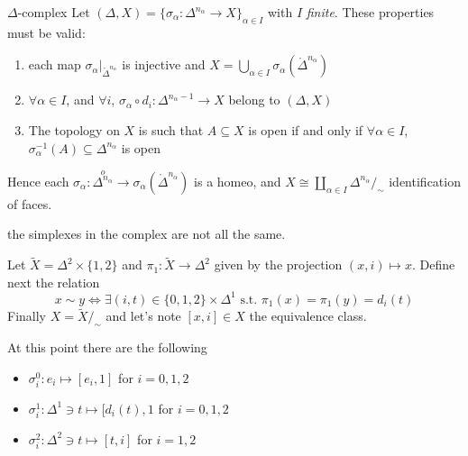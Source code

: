 \begin{definition}{\(\Delta\)-complex}
    Let \({(\Delta, X)} = \{\sigma_{\alpha} : \Delta^{n_{\alpha} } \to
    X\}_{\alpha \in I}  \) with \(I\) \emph{finite}. These properties must be
    valid:
\begin{enumerate}[label = \arabic*.]
\item each map \(\sigma_{\alpha}|_{\mathring{\Delta}^{n_{\alpha} }}\) is injective and \(X = \bigcup_{\alpha
\in I} \sigma_{\alpha} {\left( \mathring{\Delta}^{n_{\alpha} } \right)} \) 
    \item  \(\forall \alpha \in I\), and \(\forall i\), \(\sigma_{\alpha} \circ
        d_{i} : \Delta^{n_{\alpha} - 1} \to X\) belong to \({(\Delta, X)}\) 
    \item The topology on \(X\) is such that \(A \subseteq X \) is open if and
        only if \(\forall \alpha \in I\), \(\sigma_{\alpha} ^{-1}{(A)} \subseteq
        \Delta^{n_{\alpha} }\) is open 
\end{enumerate}
    Hence each \(\sigma_{\alpha} : \overset{o}{\Delta^{n_{\alpha} }} \to
    \sigma_{\alpha} {\left( \mathring{\Delta}^{n_{\alpha} } \right)} \) is a
    homeo, and \(X \cong \coprod_{\alpha \in I} \Delta^{n_{\alpha} } /_\sim \)
    identification of faces.

\end{definition}
\begin{remark}{}
    the simplexes in the complex are not all the same.
\end{remark}

\begin{example}{}
    Let \(\tilde{X} = \Delta^2 \times \{1,2\} \) and \(\pi_{1} : \tilde{X} \to
    \Delta^2\) given by the projection \({(x, i)} \mapsto x\). Define next the
    relation
    \[
      x  \sim  y \iff \exists {(i, t)} \in \{0,1,2\} \times \Delta^{1} \text{ s.t. }
      \pi_{1}{(x)} = \pi_{1}{(y)} = d_{i}{(t)}
    \]
    Finally \(X = \tilde{X} /_\sim \) and let's note \([x,i] \in X\) the
    equivalence class.

    At this point there are the following
\begin{itemize}[label = --]
    \item[0-Simplexes:] \(\sigma_{i}^{0} : e_{i} \mapsto [e_{i}, 1]\) for \(i =
        0,1,2\) 
    \item[1-Simplexes:] \(\sigma_{i}^{1} : \Delta^{1} \ni t \mapsto [d_{i}{(t)},
        1\) for \(i = 0,1,2\) 
    \item[2-Simplexes:] \(\sigma_{i}^2 : \Delta^2 \ni t \mapsto [t, i] \) for
        \(i = 1,2\) 
\end{itemize}
\end{example}

